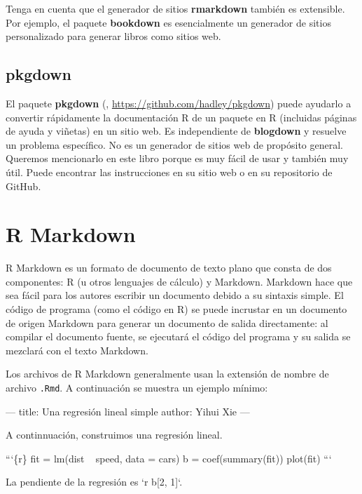 \documentclass[12pt,]{krantz}
\makeatletter
\newenvironment{Shaded}{\begin{snugshade}}{\end{snugshade}}
\newcommand{\BaseNTok}[1]{\textcolor[rgb]{0.00,0.00,0.81}{#1}}
\newcommand{\NormalTok}[1]{#1}
\newenvironment{kframe}{%
\medskip{}
\setlength{\fboxsep}{.8em}
 \def\at@end@of@kframe{}%
 \ifinner\ifhmode%
  \def\at@end@of@kframe{\end{minipage}}%
  \begin{minipage}{\columnwidth}%
 \fi\fi%
 \def\FrameCommand##1{\hskip\@totalleftmargin \hskip-\fboxsep
 \colorbox{shadecolor}{##1}\hskip-\fboxsep
     \hskip-\linewidth \hskip-\@totalleftmargin \hskip\columnwidth}%
 \MakeFramed {\advance\hsize-\width
   \@totalleftmargin\z@ \linewidth\hsize
   \@setminipage}}%
 {\par\unskip\endMakeFramed%
 \at@end@of@kframe}
\renewenvironment{Shaded}{\begin{kframe}}{\end{kframe}}
\theoremstyle{definition}
\theoremstyle{definition}
\theoremstyle{definition}
\theoremstyle{remark}
\makeatother
\begin{document}
Tenga en cuenta que el generador de sitios \textbf{rmarkdown} también es
extensible. Por ejemplo, el paquete \textbf{bookdown} \citep{R-bookdown}
es esencialmente un generador de sitios personalizado para generar
libros como sitios web.

\hypertarget{pkgdown}{%
\section{pkgdown}\label{pkgdown}}

El paquete \textbf{pkgdown} (\citet{R-pkgdown},
\url{https://github.com/hadley/pkgdown}) puede ayudarlo a convertir
rápidamente la documentación R de un paquete en R (incluidas páginas de
ayuda y viñetas) en un sitio web. Es independiente de \textbf{blogdown}
y resuelve un problema específico. No es un generador de sitios web de
propósito general. Queremos mencionarlo en este libro porque es muy
fácil de usar y también muy útil. Puede encontrar las instrucciones en
su sitio web o en su repositorio de GitHub.

\cleardoublepage

\hypertarget{appendix-apendice}{%
\appendix {}}


\hypertarget{r-markdown}{%
\chapter{R Markdown}\label{r-markdown}}

R Markdown  \citep{R-markdown} es un formato de
documento de texto plano que consta de dos componentes: R (u otros
lenguajes de cálculo) y Markdown. Markdown hace que sea fácil para los
autores escribir un documento debido a su sintaxis simple. El código de
programa (como el código en R) se puede incrustar en un documento de
origen Markdown para generar un documento de salida directamente: al
compilar el documento fuente, se ejecutará el código del programa y su
salida se mezclará con el texto Markdown.

Los archivos de R Markdown generalmente usan la extensión de nombre de
archivo \texttt{.Rmd}. A continuación se muestra un ejemplo mínimo:

\begin{Shaded}
\begin{Highlighting}[]
\NormalTok{---}
\NormalTok{title: Una regresión lineal simple}
\NormalTok{author: Yihui Xie}
\NormalTok{---}

\NormalTok{A continnuación, construimos una regresión lineal.}

\NormalTok{```\{r\}}
\NormalTok{fit = lm(dist ~ speed, data = cars)}
\NormalTok{b = coef(summary(fit))}
\NormalTok{plot(fit)}
\NormalTok{```}

\NormalTok{La pendiente de la regresión es }\BaseNTok{`r b[2, 1]`}\NormalTok{.}
\end{Highlighting}
\end{Shaded}
\end{document}
